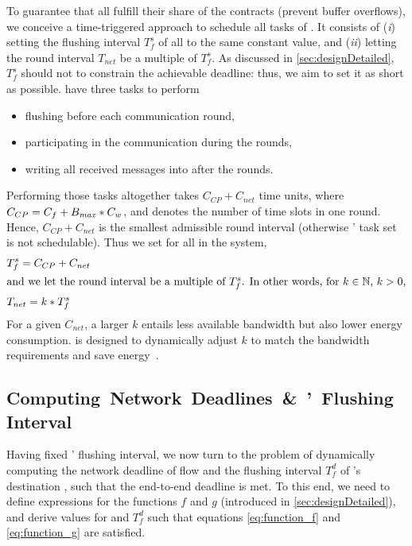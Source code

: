To guarantee that all \CPs fulfill their share of the contracts (\ie prevent buffer overflows), we conceive a time-triggered approach to schedule all tasks of \CPs. It consists of (\emph{i}) setting the flushing interval $T_f^s$ of all \CPs to the same constant value, and (\emph{ii}) letting the round interval $T_{net}$ be a multiple of $T_f^s$.
As discussed in \cref{sec:designDetailed}, $T_f^s$ should not to constrain the achievable deadline: thus, we aim to set it as short as possible.
\CPs have three tasks to perform
\begin{itemize}
 \item flushing \bolt before each communication round,
 \item participating in the communication during the rounds,
 \item writing all received messages into \bolt after the rounds.
\end{itemize}
Performing those tasks altogether takes $C_{CP} + C_{net}$ time units, where $C_{CP} = C_f + B_{\mathit{max}} * C_w$, and \nslotsmax denotes the number of time slots in one round.
Hence, $C_{CP} + C_{net}$ is the smallest admissible round interval (otherwise \CPs' task set is not schedulable). Thus we set for all \CPs in the system,
\begin{align}
\label{eq:design_flush_period_source}
	& T_f^s = C_{CP} + C_{net} \\
\intertext{and we let the round interval be a multiple of $T_f^s$. In other words, for $k \in \mathbb{N}$, $k > 0$,}
\label{eq:design_round_period}
	& T_{net} = k * T_f^s
\end{align}
For a given $C_{net}$, a larger $k$ entails less available bandwidth but also lower energy consumption.
\blink is designed to dynamically adjust $k$ to match the bandwidth requirements and save energy~\cite{zimmerling2017Blink}.

\subsection{\mbox{Computing Network Deadlines \& \APs ' Flushing Interval}}
\label{subsec:D_Tfd_computation}

Having fixed \CPs' flushing interval, we now turn to the problem of dynamically computing the network deadline \ndeadlinei of flow \flowi and the flushing interval $T_f^d$ of \flowi's destination \apdst, such that the end-to-end deadline \deadlinei is met.
To this end, we need to define expressions for the functions $f$ and $g$ (introduced in \cref{sec:designDetailed}), and derive values for \ndeadlinei and $T_f^d$ such that equations \eqref{eq:function_f} and \eqref{eq:function_g} are satisfied.

